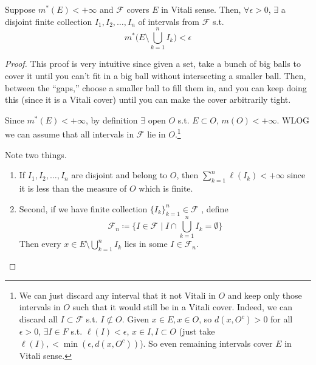   \begin{lemma}
    \label{thm:vitali-covering-lemma}
    Suppose $m^\ast (E) < +\infty$ and $\mathcal{F}$ covers $E$ in Vitali sense. Then, $\forall \epsilon > 0$, $\exists$ a disjoint finite collection $I_1, I_2, \ldots, I_n$ of intervals from $\mathcal{F}$ s.t. 
    \begin{equation}
      m^\ast \bigg( E \setminus \bigcup_{k=1}^n I_k \bigg) < \epsilon
    \end{equation}
  \end{lemma}
  \begin{proof}
    This proof is very intuitive since given a set, take a bunch of big balls to cover it until you can't fit in a big ball without intersecting a smaller ball. Then, between the ``gaps,'' choose a smaller ball to fill them in, and you can keep doing this (since it is a Vitali cover) until you can make the cover arbitrarily tight.  

    Since $m^\ast (E) < +\infty$, by definition $\exists$ open $O$ s.t. $E \subset O$, $m(O) < +\infty$. WLOG we can assume that all intervals in $\mathcal{F}$ lie in $O$.\footnote{We can just discard any interval that it not Vitali in $O$ and keep only those intervals in $O$ such that it would still be in a Vitali cover. Indeed, we can discard all $I \subset \mathcal{F}$ s.t. $I \not\subset O$. Given $x \in E, x \in O$, so $d(x, O^c) > 0$ for all $\epsilon > 0$, $\exists I \in F$ s.t. $\ell(I) < \epsilon$, $x \in I, I \subset O$ (just take $\ell(I), < \min(\epsilon, d(x, O^c))$). So even remaining intervals cover $E$ in Vitali sense. }

    Note two things. 
    \begin{enumerate}
      \item If $I_1, I_2, \ldots, I_n$ are disjoint and belong to $O$, then $\sum_{k=1}^n \ell(I_k) < +\infty$ since it is less than the measure of $O$ which is finite. 

      \item Second, if we have finite collection $\{I_k\}_{k=1}^n \in \mathcal{F}$ , define 
      \begin{equation}
        \mathcal{F}_n \coloneqq \{I \in \mathcal{F} \mid I \cap \bigcup_{k=1}^n I_k = \emptyset \}
      \end{equation}
      Then every $x \in E \setminus \bigcup_{k=1}^n I_k$ lies in some $I \in \mathcal{F}_n$. 
    \end{enumerate}


\end{proof}
